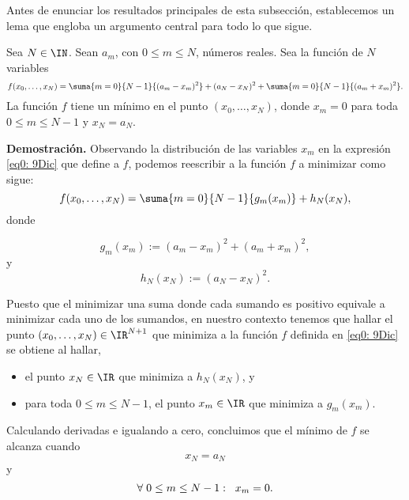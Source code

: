 Antes de enunciar los resultados 
principales de esta subsección, 
establecemos un lema que
engloba un argumento
central para todo lo que sigue.

\begin{lema}
\label{lema: lema para simetrias}
Sea $N \in \IN$. Sean $a_{m}$, con $0 \leq m \leq N$,
números reales. Sea la función de $N$ variables
\begin{equation}
\label{eq0: 9Dic}
f(x_{0}, \ldots , x_{N})= \suma{m=0}{N-1}{(a_{m}-x_{m})^{2}}
+ (a_{N}-x_{N})^{2} + \suma{m=0}{N-1}{(a_{m}+x_{m})^{2}}.
\end{equation}
La función $f$ tiene un mínimo en el punto
$(x_{0}, \ldots , x_{N})$, donde
$x_{m}=0$ para toda $0 \leq m \leq N-1$ y $x_{N}=a_{N}$.
\end{lema}
\noindent
\textbf{Demostración.}
Observando la distribución de las variables 
$x_{m}$ en la expresión \eqref{eq0: 9Dic}
que define a $f$,
podemos reescribir a la función $f$ a minimizar como sigue:
\begin{equation*}
f(x_{0}, \ldots , x_{N})= \suma{m=0}{N-1}{g_{m}(x_{m})}
+ h_{N}(x_{N}),
\end{equation*}
donde 

\begin{equation*}
g_{m}(x_{m}):= (a_{m}-x_{m})^{2}+ (a_{m}+x_{m})^{2},
\end{equation*}
y
\begin{equation*}
h_{N}(x_{N}):= (a_{N}-x_{N})^{2}.
\end{equation*}

Puesto que el minimizar una suma donde
cada sumando es positivo equivale a
minimizar cada uno de los sumandos,
en nuestro contexto tenemos que
hallar el punto $(x_{0}, \ldots , x_{N}) \in \IR^{N+1}$
que minimiza
a la función $f$ definida en 
\eqref{eq0: 9Dic} se obtiene al hallar,

\begin{itemize}
\item el punto $x_{N} \in \IR$ que minimiza a $h_{N}(x_{N})$, y
\item para toda $0 \leq m \leq N-1$, el punto $x_{m} \in \IR$
que minimiza a $g_{m}(x_{m})$.
\end{itemize} 

Calculando derivadas e igualando a cero, concluimos que
el mínimo de $f$ se alcanza cuando
\begin{equation}
x_{N}= a_{N}
\end{equation}
y
\begin{equation}
\forall \hspace{0.1cm} 0 \leq m \leq N-1 : \hspace{0.2cm}
x_{m}=0.
\end{equation}
\QEDB
\vspace{0.2cm}

